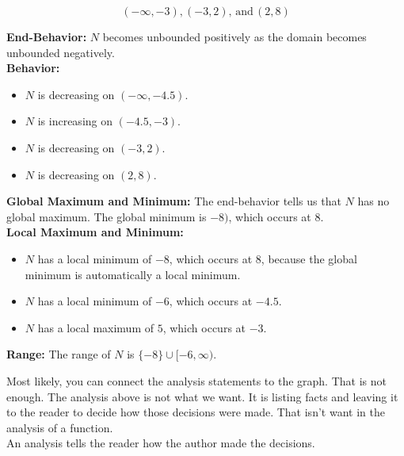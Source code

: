 \documentclass{ximera}
\begin{document}
\begin{example}
\[
(-\infty, -3), (-3, 2), \, \text{and} \, (2, 8)
\]


\textbf{End-Behavior:}  $N$ becomes unbounded positively as the domain becomes unbounded negatively.\\

\textbf{Behavior:}  

\begin{itemize}
	\item $N$ is decreasing on $(-\infty, -4.5)$.
	\item $N$ is increasing on $(-4.5, -3)$.
	\item $N$ is decreasing on $(-3, 2)$.
	\item $N$ is decreasing on $(2, 8)$.
\end{itemize}



\textbf{Global Maximum and Minimum:} The end-behavior tells us that $N$ has no global maximum.  The global minimum is $-8)$, which occurs at $8$.  \\


\textbf{Local Maximum and Minimum:} 

\begin{itemize}
	\item $N$ has a local minimum of $-8$, which occurs at $8$, because the global minimum is automatically a local minimum.
	\item $N$ has a local minimum of $-6$, which occurs at $-4.5$.
	\item $N$ has a local maximum of $5$, which occurs at $-3$.

\end{itemize}

\textbf{Range:} The range of $N$ is $\{ -8 \} \cup [-6, \infty)$. \\ 


\end{example}


Most likely, you can connect the analysis statements to the graph. That is not enough. The analysis above is not what we want.  It is listing facts and leaving it to the reader to decide how those decisions were made.  That isn't want in the analysis of a function. \\


An analysis tells the reader how the author made the decisions.\\
\end{document}
